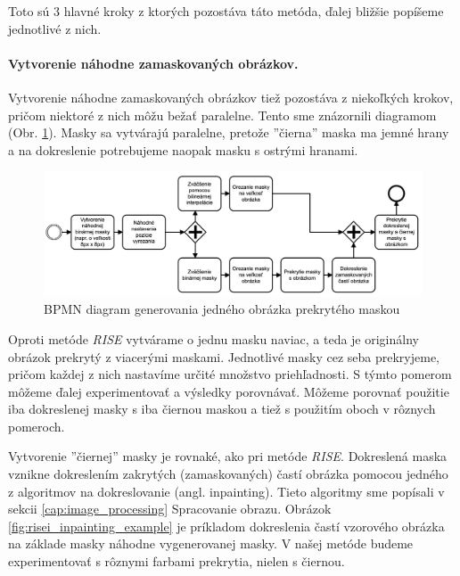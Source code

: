 Toto sú 3 hlavné kroky z ktorých pozostáva táto metóda, ďalej bližšie popíšeme jednotlivé z nich.

\paragraph{Vytvorenie náhodne zamaskovaných obrázkov.}

Vytvorenie náhodne zamaskovaných obrázkov tiež pozostáva z niekoľkých krokov, pričom niektoré z nich môžu bežať paralelne. Tento sme znázornili diagramom (Obr. \ref{fig:risei_diagram}). Masky sa vytvárajú paralelne, pretože ''čierna'' maska ma jemné hrany a na dokreslenie potrebujeme naopak masku s ostrými hranami.

\begin{figure}[h!]
    \centering
    \includegraphics[scale=0.45]{assets/images/risei_diagram.png}
    \caption{BPMN diagram generovania jedného obrázka prekrytého maskou}
    \label{fig:risei_diagram}
\end{figure}

Oproti metóde \textit{RISE} vytvárame o jednu masku naviac, a teda je originálny obrázok prekrytý z viacerými maskami. Jednotlivé masky cez seba prekryjeme, pričom každej z nich nastavíme určité množstvo priehľadnosti. S týmto pomerom môžeme ďalej experimentovať a výsledky porovnávať. Môžeme porovnať použitie iba dokreslenej masky s iba čiernou maskou a tiež s použitím oboch v rôznych pomeroch.

Vytvorenie ''čiernej'' masky je rovnaké, ako pri metóde \textit{RISE}. Dokreslená maska vznikne dokreslením zakrytých (zamaskovaných) častí obrázka pomocou jedného z algoritmov na dokreslovanie (angl. inpainting). Tieto algoritmy sme popísali v sekcii \ref{cap:image_processing} Spracovanie obrazu. Obrázok \ref{fig:risei_inpainting_example} je príkladom dokreslenia častí vzorového obrázka na základe masky náhodne vygenerovanej masky. V našej metóde budeme experimentovať s rôznymi farbami prekrytia, nielen s čiernou.

